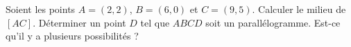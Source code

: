 
\begin{exercice}\label{exoSeconde-0011}

    Soient les points \( A=(2,2)\), \( B=(6,0)\) et \( C=(9,5)\). Calculer le milieu de \( [AC]\). Déterminer un point \( D\) tel que \( ABCD\) soit un parallélogramme. Est-ce qu'il y a plusieurs possibilités ?

\end{exercice}
